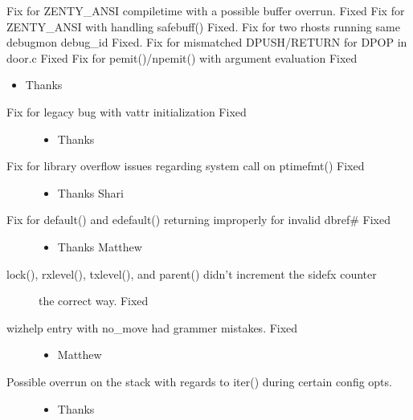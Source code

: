 \documentclass[letterpaper,10pt,english]{sphinxmanual}
\begin{document}
\sphinxAtStartPar
Fix for ZENTY\_ANSI compiletime with a possible buffer overrun. \sphinxhyphen{} Fixed
Fix for ZENTY\_ANSI with handling safebuff() \sphinxhyphen{} Fixed.
Fix for two rhosts running same debugmon debug\_id \sphinxhyphen{} Fixed.
Fix for mis\sphinxhyphen{}matched DPUSH/RETURN for DPOP in door.c \sphinxhyphen{} Fixed
Fix for pemit()/npemit() with argument evaluation \sphinxhyphen{} Fixed
\begin{itemize}
\item {} 
\sphinxAtStartPar
Thanks 

\end{itemize}
\begin{description}
\item[{Fix for legacy bug with vattr initialization \sphinxhyphen{} Fixed}] \leavevmode\begin{itemize}
\item {} 
\sphinxAtStartPar
Thanks 

\end{itemize}

\item[{Fix for library overflow issues regarding system call on ptimefmt() \sphinxhyphen{} Fixed}] \leavevmode\begin{itemize}
\item {} 
\sphinxAtStartPar
Thanks Shari

\end{itemize}

\item[{Fix for default() and edefault() returning improperly for invalid dbref\# \sphinxhyphen{} Fixed}] \leavevmode\begin{itemize}
\item {} 
\sphinxAtStartPar
Thanks Matthew

\end{itemize}

\item[{lock(), rxlevel(), txlevel(), and parent() didn’t increment the sidefx counter}] \leavevmode
\sphinxAtStartPar
the correct way.  \sphinxhyphen{} Fixed

\item[{wizhelp entry with no\_move had grammer mistakes. \sphinxhyphen{} Fixed}] \leavevmode\begin{itemize}
\item {} 
\sphinxAtStartPar
Matthew

\end{itemize}

\item[{Possible overrun on the stack with regards to iter() during certain config opts.}] \leavevmode\begin{itemize}
\item {} 
\sphinxAtStartPar
Thanks 

\end{itemize}

\end{description}
\end{document}
